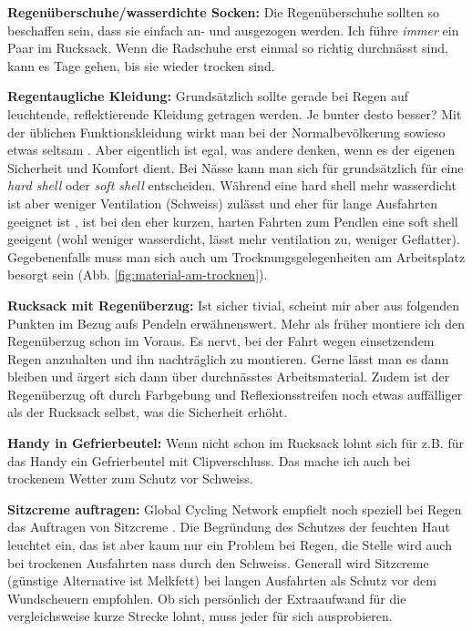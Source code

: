 \textbf{Regenüberschuhe/wasserdichte Socken:}
Die Regenüberschuhe sollten so beschaffen sein, dass sie einfach an- und ausgezogen werden.
Ich führe \emph{immer} ein Paar im Rucksack.
Wenn die Radschuhe erst einmal so richtig durchnässt sind,
kann es Tage gehen, bis sie wieder trocken sind.

\textbf{Regentaugliche Kleidung:}
Grundsätzlich sollte gerade bei Regen auf leuchtende, reflektierende Kleidung getragen werden.
Je bunter desto besser?
Mit der üblichen Funktionskleidung wirkt man bei der Normalbevölkerung sowieso etwas seltsam \cite{Rasche2016albern}.
Aber eigentlich ist egal, was andere denken, wenn es der eigenen Sicherheit und Komfort dient.
Bei Nässe kann man sich für grundsätzlich für eine \textsl{hard shell} oder \textsl{soft shell} entscheiden.
Während eine hard shell mehr wasserdicht ist aber weniger Ventilation (Schweiss) zulässt
und eher für lange Ausfahrten geeignet ist \cite{gcn2015rain},
ist bei den eher kurzen, harten Fahrten zum Pendlen eine soft shell geeigent
(wohl weniger wasserdicht, lässt mehr ventilation zu, weniger Geflatter).
Gegebenenfalls muss man sich auch um Trocknungsgelegenheiten am Arbeitsplatz besorgt sein (Abb. \ref{fig:material-am-trocknen}).

\textbf{Rucksack mit Regenüberzug:}
Ist sicher tivial, scheint mir aber aus folgenden Punkten im Bezug aufs Pendeln erwähnenswert.
Mehr als früher montiere ich den Regenüberzug schon im Voraus.
Es nervt, bei der Fahrt wegen einsetzendem Regen anzuhalten und ihn nachträglich zu montieren.
Gerne lässt man es dann bleiben und ärgert sich dann über durchnässtes Arbeitsmaterial.
Zudem ist der Regenüberzug oft durch Farbgebung und Reflexionsstreifen noch etwas auffälliger als der Rucksack selbst,
was die Sicherheit erhöht.

\textbf{Handy in Gefrierbeutel:}
Wenn nicht schon im Rucksack lohnt sich für z.B. für das Handy ein Gefrierbeutel mit Clipverschluss.
Das mache ich auch bei trockenem Wetter zum Schutz vor Schweiss.

\textbf{Sitzcreme auftragen:}
Global Cycling Network empfielt noch speziell bei Regen das Auftragen von Sitzcreme \cite{gcn2013rain,gcn2015rain}.
Die Begründung des Schutzes der feuchten Haut leuchtet ein, das ist aber kaum nur ein Problem bei Regen,
die Stelle wird auch bei trockenen Ausfahrten nass durch den Schweiss.
Generall wird Sitzcreme (günstige Alternative ist Melkfett) bei langen Ausfahrten als Schutz vor dem Wundscheuern empfohlen.
Ob sich persönlich der Extraaufwand für die vergleichsweise kurze Strecke lohnt, muss jeder für sich ausprobieren.

